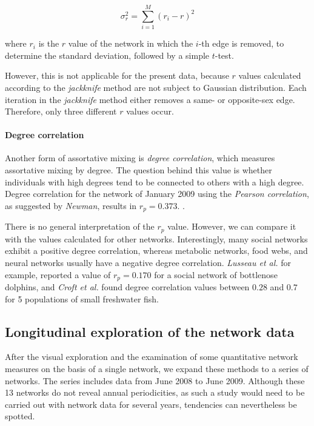 \begin{equation}
\sigma_r^2 = \sum_{i=1}^M(r_i -r)^2
\label{eq:ass_coeff_gender}
\end{equation}  

where $r_i$ is the $r$ value of the network in which the $i$-th edge is removed, to determine the standard deviation, followed by a simple $t$-test\citep{snijders:99}.

However, this is not applicable for the present data, because $r$ values calculated according to the \textit{jackknife} method are not subject to Gaussian distribution. Each iteration in the \textit{jackknife} method either removes a same- or opposite-sex edge. Therefore, only three different $r$ values occur.

\paragraph{Degree correlation}
\label{para:degree_corr}
 
Another form of assortative mixing is \textit{degree correlation}, which measures assortative mixing by degree. The question behind this value is whether individuals with high degrees tend to be connected to others with a high degree\citep{croft:07}. Degree correlation for the network of January 2009 using the \textit{Pearson correlation}, as suggested by \textit{Newman}\citep{newman:02}, results in $r_p = 0.373$. \citep{newman:03a}.  

There is no general interpretation of the $r_p$ value. However, we can compare it with the values calculated for other networks. Interestingly, many social networks exhibit a positive degree correlation, whereas metabolic networks, food webs, and neural networks usually have a negative degree correlation\citep{newman:03a}. \textit{Lusseau et al.}\citep{lusseau:06} for example, reported a value of $r_p = 0.170$ for a social network of bottlenose dolphins, and \textit{Croft et al.}\citep{croft:05} found degree correlation values between $0.28$ and $0.7$ for 5 populations of small freshwater fish.      
 
\subsection{Longitudinal exploration of the network data}
\label{subsec:longitudinal}

After the visual exploration and the examination of some quantitative network measures on the basis of a single network, we expand these methods to a series of networks. The series includes data from June 2008 to June 2009. Although these 13 networks do not reveal annual periodicities, as such a study would need to be carried out with network data for several years, tendencies can nevertheless be spotted.
 
